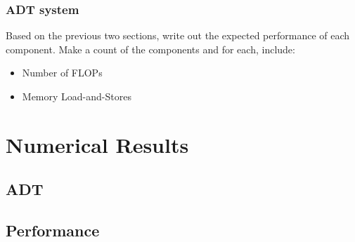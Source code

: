 \documentclass[11pt]{article}
\begin{document}
\subsubsection{ADT system}
Based on the previous two sections, write out the expected performance of each component.  Make a count of the
components and for each, include:
\begin{itemize}
\item Number of FLOPs
\item Memory Load-and-Stores
\end{itemize}

\section{Numerical Results}
\subsection{ADT}
\subsection{Performance}
\end{document}
